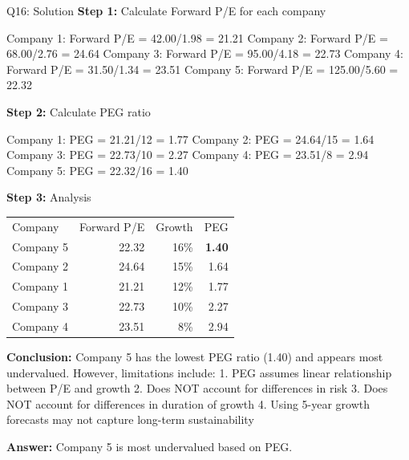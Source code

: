 \documentclass{beamer}
\renewcommand{\scriptsize}{\fontsize{6pt}{7pt}\selectfont}
\begin{document}
	\begin{frame}{Q16: Solution}
		\scriptsize
		\textbf{Step 1:} Calculate Forward P/E for each company
		
		Company 1: Forward P/E = 42.00/1.98 = 21.21
		Company 2: Forward P/E = 68.00/2.76 = 24.64
		Company 3: Forward P/E = 95.00/4.18 = 22.73
		Company 4: Forward P/E = 31.50/1.34 = 23.51
		Company 5: Forward P/E = 125.00/5.60 = 22.32
		
		\vspace{2pt}
		\textbf{Step 2:} Calculate PEG ratio
		
		Company 1: PEG = 21.21/12 = 1.77
		Company 2: PEG = 24.64/15 = 1.64
		Company 3: PEG = 22.73/10 = 2.27
		Company 4: PEG = 23.51/8 = 2.94
		Company 5: PEG = 22.32/16 = 1.40
		
		\vspace{2pt}
		\textbf{Step 3:} Analysis
		
		\vspace{2pt}
		\begin{tabular}{lrrr}
			Company & Forward P/E & Growth & PEG \\
			Company 5 & 22.32 & 16\% & \textbf{1.40} \\
			Company 2 & 24.64 & 15\% & 1.64 \\
			Company 1 & 21.21 & 12\% & 1.77 \\
			Company 3 & 22.73 & 10\% & 2.27 \\
			Company 4 & 23.51 & 8\% & 2.94 \\
		\end{tabular}
		
		\vspace{2pt}
		\textbf{Conclusion:} Company 5 has the lowest PEG ratio (1.40) and appears most undervalued. However, limitations include:
		1. PEG assumes linear relationship between P/E and growth
		2. Does NOT account for differences in risk
		3. Does NOT account for differences in duration of growth
		4. Using 5-year growth forecasts may not capture long-term sustainability
		
		\textbf{Answer:} Company 5 is most undervalued based on PEG.
	\end{frame}
	
\end{document}
